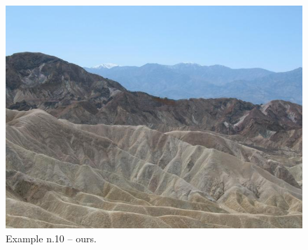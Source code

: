 \documentclass[a4paper, 11pt]{article}
\begin{document}
\begin{figure}
    \centering
    \includegraphics[width=.95\linewidth]{documentation/img/modified/0114.png}
    \caption{Example n.10 -- ours.}
    \label{img:ex_n.10_mask}
\end{figure}
\end{document}
